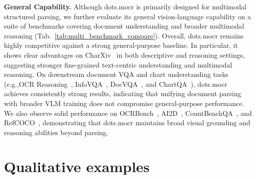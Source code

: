 \documentclass{article}
\begin{document}
\begin{table}[h]
\centering
\caption{Performance comparison on CharXiv, OCR reasoning, and a suite of document and vision-language benchmarks.}
\label{tab:multi_benchmark_compare}
\end{table}


\textbf{General Capability.} Although dots.mocr is primarily designed for multimodal structured parsing, we further evaluate its general vision-language capability on a suite of benchmarks covering document understanding and broader multimodal reasoning (Tab.~\ref{tab:multi_benchmark_compare}). Overall, dots.mocr remains highly competitive against a strong general-purpose baseline. In particular, it shows clear advantages on CharXiv~\cite{wang2024charxiv} in both descriptive and reasoning settings, suggesting stronger fine-grained text-centric understanding and multimodal reasoning. On downstream document VQA and chart understanding tasks (e.g.,OCR Reasoning~\cite{huang2025ocr}, InfoVQA~\cite{mathew2022infographicvqa}, DocVQA~\cite{mathew2021docvqa}, and ChartQA~\cite{masry2022chartqa}), dots.mocr  achieves consistently strong results, indicating that unifying document parsing with broader VLM training does not compromise general-purpose performance. We also observe solid performance on OCRBench~\cite{liu2024ocrbench}, AI2D~\cite{kembhavi2016diagram}, CountBenchQA~\cite{paiss2023countclip}, and RefCOCO~\cite{yu2016modeling}, demonstrating that dots.mocr maintains broad visual grounding and reasoning abilities beyond parsing.

\section{Qualitative examples}
\label{sec:examples}
\end{document}
